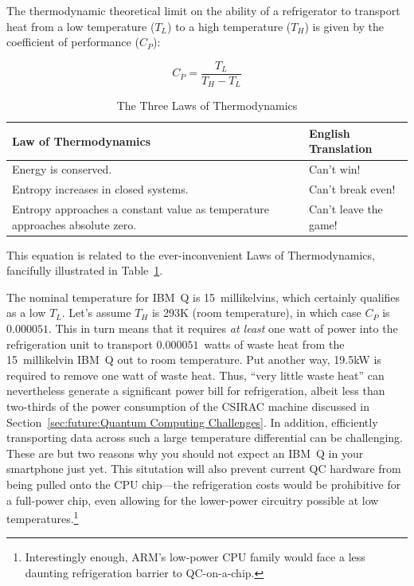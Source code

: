The thermodynamic theoretical limit on the ability of a refrigerator
to transport heat from a low temperature ($T_L$) to a high temperature
($T_H$) is given by the coefficient of performance ($C_P$):

\begin{equation}
	C_P = \frac{T_L}{T_H - T_L}
\end{equation}

\begin{table}
\begin{tabular}{p{1.5in}|p{1.2in}}
Law of Thermodynamics
	& English Translation \\
\hline
\hline
Energy is conserved.
	& Can't win! \\
\hline
Entropy increases in closed systems.
	& Can't break even! \\
\hline
Entropy approaches a constant value as temperature approaches absolute zero.
	& Can't leave the game! \\
\end{tabular}
\caption{The Three Laws of Thermodynamics}
\label{tab:future:The Three Laws of Thermodynamics}
\end{table}

This equation is related to the ever-inconvenient Laws of Thermodynamics,
fancifully illustrated in
Table~\ref{tab:future:The Three Laws of Thermodynamics}.

The nominal temperature for IBM~Q is 15~millikelvins, which certainly
qualifies as a low $T_L$.
Let's assume $T_H$ is 293K (room temperature),
in which case $C_P$ is $0.000051$.
This in turn means that it requires \emph{at least} one watt of
power into the refrigeration unit to transport $0.000051$~watts
of waste heat from the 15~millikelvin IBM~Q out to room temperature.
Put another way, 19.5kW is required to remove one watt of waste heat.
Thus, ``very little waste heat'' can nevertheless generate a significant
power bill for refrigeration, albeit less than two-thirds of the power
consumption of the CSIRAC machine discussed in
Section~\ref{sec:future:Quantum Computing Challenges}.
In addition, efficiently transporting data across such a large
temperature differential can be challenging.
These are but two reasons why you should not expect an IBM~Q in your
smartphone just yet.
This situtation will also prevent current QC hardware from being pulled
onto the CPU chip---the refrigeration costs would be prohibitive for
a full-power chip, even allowing for the lower-power circuitry possible
at low temperatures.\footnote{
	Interestingly enough, ARM's low-power CPU family would face
	a less daunting refrigeration barrier to QC-on-a-chip.}

